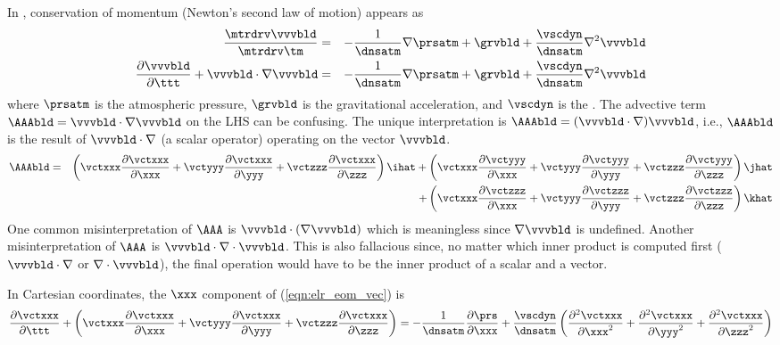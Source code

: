 \documentclass[12pt,twoside]{book}
\begin{document}
In , conservation of momentum
(Newton's second law of motion) appears as 
\begin{eqnarray}
\frac{\mtrdrv \vvvbld}{\mtrdrv \tm} 
& = &
-\frac{1}{\dnsatm} \nabla \prsatm + \grvbld + 
\frac{\vscdyn}{\dnsatm} \nabla^{2} \vvvbld 
\nonumber \\
\frac{\partial \vvvbld}{\partial \ttt} + \vvvbld \cdot \nabla \vvvbld 
& = &
-\frac{1}{\dnsatm} \nabla \prsatm + \grvbld + 
\frac{\vscdyn}{\dnsatm} \nabla^{2} \vvvbld
\label{eqn:elr_eom_vec}
\end{eqnarray}
where $\prsatm$ is the atmospheric pressure, $\grvbld$ is the
gravitational acceleration, and $\vscdyn$ is the .
The advective term $\AAAbld = \vvvbld \cdot \nabla \vvvbld$ on the
LHS can be confusing.
The unique interpretation is $\AAAbld = ( \vvvbld \cdot \nabla )
\vvvbld$, i.e., $\AAAbld$ is the result of $\vvvbld \cdot \nabla$ (a
scalar operator) operating on the vector $\vvvbld$.
\begin{eqnarray}
\AAAbld & = &
\left( 
\vctxxx \frac{\partial \vctxxx}{\partial \xxx} +
\vctyyy \frac{\partial \vctxxx}{\partial \yyy} +
\vctzzz \frac{\partial \vctxxx}{\partial \zzz} 
\right) \ihat + 
\left( 
\vctxxx \frac{\partial \vctyyy}{\partial \xxx} +
\vctyyy \frac{\partial \vctyyy}{\partial \yyy} +
\vctzzz \frac{\partial \vctyyy}{\partial \zzz} 
\right) \jhat \nonumber \\
& & + \left( 
\vctxxx \frac{\partial \vctzzz}{\partial \xxx} +
\vctyyy \frac{\partial \vctzzz}{\partial \yyy} +
\vctzzz \frac{\partial \vctzzz}{\partial \zzz} 
\right) \khat
\label{eqn:adv_dfn}
\end{eqnarray}
One common misinterpretation of $\AAA$ is $\vvvbld \cdot ( \nabla
\vvvbld )$ which is meaningless since $\nabla \vvvbld$ is undefined.
Another misinterpretation of $\AAA$ is 
$\vvvbld \cdot \nabla \cdot \vvvbld$.
This is also fallacious since, no matter which inner product is
computed first ($\vvvbld \cdot \nabla$ or $\nabla \cdot \vvvbld$), the
final operation would have to be the inner product of a scalar and a
vector. 

In Cartesian coordinates, the $\xxx$ component of 
(\ref{eqn:elr_eom_vec}) is
\begin{equation}
\frac{\partial \vctxxx}{\partial \ttt} + 
\left( 
\vctxxx \frac{\partial \vctxxx}{\partial \xxx} +
\vctyyy \frac{\partial \vctxxx}{\partial \yyy} +
\vctzzz \frac{\partial \vctxxx}{\partial \zzz} 
\right) =  
-\frac{1}{\dnsatm} \frac{\partial \prs}{\partial \xxx} +
\frac{\vscdyn}{\dnsatm} 
\left( 
\frac{\partial^{2} \vctxxx}{\partial \xxx^{2}} +
\frac{\partial^{2} \vctxxx}{\partial \yyy^{2}} +
\frac{\partial^{2} \vctxxx}{\partial \zzz^{2}} 
\right) 
\label{eqn:mmn_cns_scl}
\end{equation}
\end{document}

